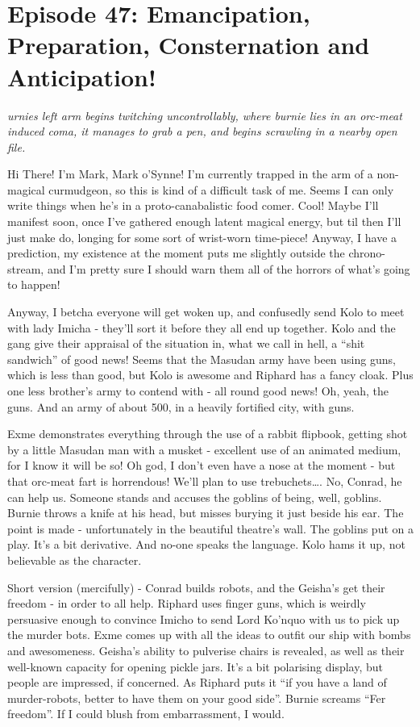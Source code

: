 \section{Episode 47: Emancipation, Preparation, Consternation and Anticipation!}

\begin{multicols}{2}

\textit{urnies left arm begins twitching uncontrollably, where burnie lies in an orc-meat induced coma, it manages to grab a pen, and begins scrawling in a nearby open file.} \medskip

Hi There! I’m Mark, Mark o’Synne! I’m currently trapped in the arm of a non-magical curmudgeon, so this is kind of a difficult task of me. Seems I can only write things when he’s in a proto-canabalistic food comer. Cool! Maybe I’ll manifest soon, once I’ve gathered enough latent magical energy, but til then I’ll just make do, longing for some sort of wrist-worn time-piece! Anyway, I have a prediction, my existence at the moment puts me slightly outside the chrono-stream, and I’m pretty sure I should warn them all of the horrors of what’s going to happen!\medskip

Anyway, I betcha everyone will get woken up, and confusedly send Kolo to meet with lady Imicha - they’ll sort it before they all end up together. Kolo and the gang give their appraisal of the situation in, what we call in hell, a “shit sandwich” of good news! Seems that the Masudan army have been using guns, which is less than good, but Kolo is awesome and Riphard has a fancy cloak. Plus one less brother’s army to contend with - all round good news! Oh, yeah, the guns. And an army of about 500, in a heavily fortified city, with guns.\medskip

Exme demonstrates everything through the use of a rabbit flipbook, getting shot by a little Masudan man with a musket - excellent use of an animated medium, for I know it will be so! Oh god, I don’t even have a nose at the moment - but that orc-meat fart is horrendous! We’ll plan to use trebuchets…. No, Conrad, he can help us. Someone stands and accuses the goblins of being, well, goblins. Burnie throws a knife at his head, but misses burying it just beside his ear. The point is made - unfortunately in the beautiful theatre’s wall. The goblins put on a play. It’s a bit derivative. And no-one speaks the language. Kolo hams it up, not believable as the character.\medskip

Short version (mercifully) - Conrad builds robots, and the Geisha’s get their freedom - in order to all help. Riphard uses finger guns, which is weirdly persuasive enough to convince Imicho to send Lord Ko’nquo with us to pick up the murder bots. Exme comes up with all the ideas to outfit our ship with bombs and awesomeness. Geisha’s ability to pulverise chairs is revealed, as well as their well-known capacity for opening pickle jars. It’s a bit polarising display, but people are impressed, if concerned. As Riphard puts it “if you have a land of murder-robots, better to have them on your good side”. Burnie screams “Fer freedom”. If I could blush from embarrassment, I would.\medskip


\end{multicols}
